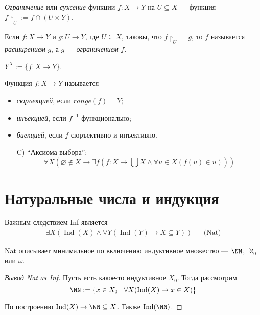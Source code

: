 \documentclass[12pt,a4paper]{article}
\DeclareMathOperator{\Ind}{Ind}
\begin{document}
    \begin{definition}
        \emph{Ограничение} или \emph{сужение} функции $f: X \to Y$ на $U \subseteq X$ --- функция $f\upharpoonright_U := f \cap (U \times Y)$.
        
        Если $f: X \to Y$ и $g: U \to Y$, где $U \subseteq X$, таковы, что $f\upharpoonright_U = g$, то $f$ называется \emph{расширением} $g$, а $g$ --- \emph{ограничением} $f$.
    \end{definition}

    \begin{definition}
        $Y^X := \{f: X \to Y\}$.
    \end{definition}

    \begin{definition}
        Функция $f: X \to Y$ называется 
        \begin{itemize}
            \item \emph{сюръекцией},  если $range(f) = Y$;
            \item \emph{инъекцией}, если $f^{-1}$ функционально;
            \item \emph{биекцией}, если $f$ сюръективно и инъективно.
        \end{itemize}
    \end{definition}

    \begin{itemize}
        \item[C)] ``Аксиома выбора'':
            \[\forall X (\varnothing \notin X \to \exists f (f: X \to \bigcup X \wedge \forall u \in X (f(u) \in u)))\]
    \end{itemize}

    \section{Натуральные числа и индукция}

    Важным следствием Inf является
    \begin{align*}
        \exists X (\Ind(X) \wedge \forall Y (\Ind(Y) \to X \subseteq Y))&& \text{(Nat)}
    \end{align*}

    Nat описывает минимальное по включению индуктивное множество --- $\NN$, $\aleph_0$ или $\omega$.

    \begin{proof}[Вывод Nat из Inf]
        Пусть есть какое-то индуктивное $X_0$. Тогда рассмотрим
        \[\NN := \{x \in X_0 \mid \forall X (\Ind(X) \to x \in X)\}\]

        По построению $\Ind(X) \rightarrow \NN \subseteq X$. Также $\Ind(\NN)$.
    \end{proof}
\end{document}
